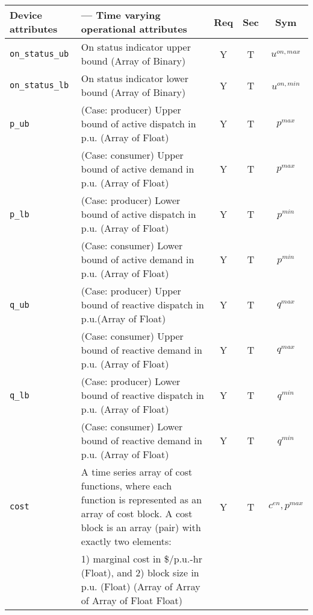 \documentclass{article}
\begin{document}
\begin{center}
\small
\begin{tabular}{ l | p{3.8in} | c | c | c |}
Device attributes & --- Time varying operational attributes &Req &Sec &Sym \\
\hline
  {\tt on\_status\_ub} & {On status indicator upper bound (Array of Binary)} & Y & T & $u^{on,max}$\\
  {\tt on\_status\_lb} & {On status indicator lower bound (Array of Binary)} & Y & T & $u^{on,min}$\\
  {\tt p\_ub} & { (Case: producer) Upper bound of active dispatch in p.u. (Array of Float)   }& Y & T & $p^{max}$ \\
              & { (Case: consumer) Upper bound of active demand in p.u.  (Array of Float)    }& Y & T & $p^{max}$ \\
  {\tt p\_lb} & { (Case: producer) Lower bound of active dispatch in p.u. (Array of Float)    }& Y & T & $p^{min}$ \\
              & { (Case: consumer) Lower bound of active demand in p.u.  (Array of Float)    }& Y & T & $p^{min}$ \\
  {\tt q\_ub} & { (Case: producer) Upper bound of reactive dispatch in p.u.(Array of Float)  }& Y & T & $q^{max}$\\
              & { (Case: consumer) Upper bound of reactive demand  in p.u. (Array of Float)  }& Y & T & $q^{max}$\\
  {\tt q\_lb} & { (Case: producer) Lower bound of reactive dispatch in p.u. (Array of Float)  }& Y & T & $q^{min}$\\
              & { (Case: consumer) Lower bound of reactive demand in p.u.  (Array of Float)  }& Y & T & $q^{min}$\\
  {\tt cost} &  A time series array of cost functions, where each function is represented as an array of cost block.  A cost block is an array (pair) with exactly two elements: & Y & T & $c^{en}, p^{max}$ \\
      &1) marginal cost in \$/p.u.-hr (Float), and 2) block size in p.u. (Float) (Array of Array of Array of Float Float) &  &   & \\
\hline
\end{tabular}
\end{center}
\end{document}
